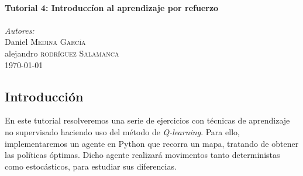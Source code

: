 \documentclass[12pt]{article}
\begin{document}
\begin{titlepage}
\HRule \\[0.7cm]
{ \huge \bfseries Tutorial 4: Introduccíon al aprendizaje por refuerzo}\\[0.4cm] %
\HRule \\[0.7cm]


\textit{Autores:}\\
Daniel \textsc{Medina García}\\ %
alejandro \textsc{rodríguez Salamanca}\\[1.1cm] %


{\large \today}\\ %


\vfill %

\end{titlepage}

\tableofcontents

\newpage
\thispagestyle{empty}
\clearpage
\vspace*{\fill}
\begin{center}
    \begin{minipage}{\textwidth}
        \begin{center}
            \section*{Introducción}
            En este tutorial resolveremos una serie de ejercicios con técnicas de aprendizaje no supervisado haciendo uso del método de \textit{Q-learning}. Para ello, implementaremos un agente en Python que recorra un mapa, tratando de obtener las políticas óptimas. Dicho agente realizará movimentos tanto deterministas como estocásticos, para estudiar sus diferencias.
        \end{center}
    \end{minipage}
\end{center}
\vfill
\end{document}
